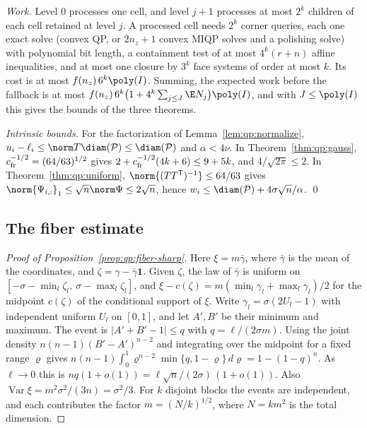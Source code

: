 \emph{Work.} Level $0$ processes one cell, and level $j+1$ processes at most
$2^k$ children of each cell retained at level $j$. A processed cell needs $2^k$
corner queries, each one exact solve (convex QP, or $2n_z+1$ convex MIQP solves
and a polishing solve) with polynomial bit length, a containment test of at
most $4^k(r+n)$ affine inequalities, and at most one closure by $3^k$ face
systems of order at most $k$. Its cost is at most
$f(n_z)\,6^k\poly(I)$. Summing, the expected work before the fallback is at
most $f(n_z)\,6^k\bigl(1+4^k\sum_{j\le J}\E N_j\bigr)\poly(I)$, and with
$J\le\poly(I)$ this gives the bounds of the three theorems.

\emph{Intrinsic bounds.} For the factorization of Lemma~\ref{lem:qp:normalize},
$u_i-\ell_i\le\norm T\diam(\mathcal P)\le\diam(\mathcal P)$ and $\alpha<4\nu$.
In Theorem~\ref{thm:qp:gauss}, $c_{\rm fr}^{-1/2}=(64/63)^{1/2}$ gives
$2+c_{\rm fr}^{-1/2}(4k+6)\le9+5k$, and $4/\sqrt{2\pi}\le2$. In
Theorem~\ref{thm:qp:uniform}, $\norm{(TT^{\mathsf T})^{-1}}\le64/63$ gives
$\norm{\Psi_{i,:}}_1\le\sqrt n\norm\Psi\le2\sqrt n$, hence
$w_i\le\diam(\mathcal P)+4\sigma\sqrt n/\alpha$. \qed

\subsection{The fiber estimate}

\begin{proof}[Proof of Proposition~\ref{prop:qp:fiber-sharp}]
Here $\xi=m\bar\gamma$, where $\bar\gamma$ is the mean of the coordinates, and
$\zeta=\gamma-\bar\gamma\mathbf1$. Given $\zeta$, the law of $\bar\gamma$ is
uniform on $[-\sigma-\min_l\zeta_l,\ \sigma-\max_l\zeta_l]$, and
$\xi-c(\zeta)=m(\min_l\gamma_l+\max_l\gamma_l)/2$ for the midpoint $c(\zeta)$
of the conditional support of $\xi$. Write $\gamma_l=\sigma(2U_l-1)$ with
independent uniform $U_l$ on $[0,1]$, and let $A',B'$ be their minimum and
maximum. The event is $|A'+B'-1|\le q$ with $q=\ell/(2\sigma m)$. Using the
joint density $n(n-1)(B'-A')^{n-2}$ and integrating over the midpoint for a
fixed range $\varrho$ gives
$n(n-1)\int_0^1\varrho^{n-2}\min\{q,1-\varrho\}\,d\varrho=1-(1-q)^n$. As
$\ell\to0$ this is $nq(1+o(1))=\ell\sqrt n/(2\sigma)\,(1+o(1))$. Also
$\operatorname{Var}\xi=m^2\sigma^2/(3n)=\sigma^2/3$. For $k$ disjoint blocks the
events are independent, and each contributes the factor $m=(N/k)^{1/2}$, where
$N=km^2$ is the total dimension.
\end{proof}

